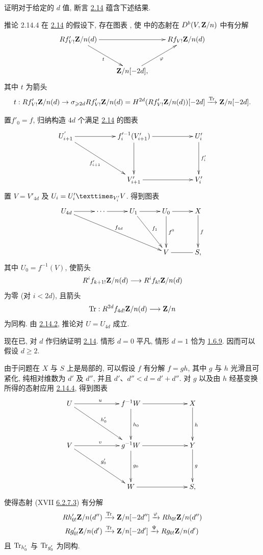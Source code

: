 证明对于给定的 $d$ 值, 断言 \hyperref[XVIII.thm2.14]{2.14} 蕴含下述结果.

\begin{enonce*}{推论 2.14.4}
在 \hyperref[XVIII.thm2.14]{2.14} 的假设下, 存在图表 , 使 \emph{} 中的态射在 $D^{b}(V,\protect\mathcal{\mathbf{Z}}/n)$ 中有分解
$$
\xymatrix@C=.75cm@R=1cm{
Rf'_{V!}\sheaf{\ZZ}/n(d)  \ar[rr] \ar[rd]_{t}&  & Rf_{V!}\sheaf{\ZZ}/n(d)\\
                          &\sheaf{\ZZ}/n[-2d], \ar[ru]_{\varphi}
}
$$
其中 $t$ 为箭头
$$
t:Rf'_{V!}\mathbf{Z}/n(d)\rightarrow \sigma_{\geqslant
2d}Rf'_{V!}\mathbf{Z}/n(d)=H^{2d}(Rf'_{V!}\mathbf{Z}/n(d))[-2d]\xrightarrow{\operatorname{Tr}}\protect\mathcal{\mathbf{Z}}/n[-2d]{}.
$$
\end{enonce*}

置\pageoriginale $f'_{0}=f$, 归纳构造 $4d$ 个满足 \hyperref[XVIII.thm2.14]{2.14} 的图表 
$$
\xymatrix@C=2cm@R=1.5cm{
U^{'}_{i+1} \ar[r]\ar[rd]_{f'_{i+1}}& f'^{-1}_{i}(V'_{i+1}) \ar[d]\ar[r]& U'_i \ar[d]^{f'_{i}}\\
            & V'_{i+1}  \ar[r]            & V'_i
}
$$
置 $V=V'_{4d}$ 及 $U_{i}=\fprod{U'_{i}}{V}{V'_{i}}$. 得到图表
$$
\xymatrix@R=1.5cm@C=1cm{
U_{4d}\ar[r] \ar[rrrd]^{f_{4d}}& \cdots \ar[r]& U_1 \ar[r]\ar[rd]^{f_1}& U_0\ar[r]\ar[d]^{f^0} & X \ar[d]^{f}\\
            &              &           & V \ar@{-}[r]  & S ,
}
$$
其中 $U_{0}=f^{-1}(V)$, 使箭头
$$
R^{i}f_{k+1!}\mathbf{Z}/n(d)\longrightarrow R^{i}f_{k!}\mathbf{Z}/n(d)
$$
为零 (对 $i<2d$), 且箭头
$$
\operatorname{Tr}:R^{2d}f_{4d!}\protect\mathcal{\mathbf{Z}}/n(d)\longrightarrow \protect\mathcal{\mathbf{Z}}/n
$$
为同构. 由 \hyperref[XVIII.lem2.14.2]{2.14.2}, 推论对 $U=U_{4d}$ 成立.

现在已, 对 $d$ 作归纳证明 \hyperref[XVIII.thm2.14]{2.14}. 情形 $d=0$ 平凡, 情形 $d=1$ 恰为 \hyperref[XVIII.lemfond1.6.9]{1.6.9}. 因而可以假设 $d\geq 2$.

由于问题在 $X$ 与 $S$ 上是局部的, 可以假设 $f$ 有分解 $f=gh$, 其中 $g$ 与 $h$ 光滑且可紧化, 纯相对维数为 $d'$ 及 $d''$, 并且 $d'$、$d''<d=d'+d''$. 对 $g$ 以及由 $h$ 经基变换所得的态射应用 \hyperref[XVIII.cor2.14.4]{2.14.4}, 得到图表
$$
\xymatrix@C=2.2cm@R=1.5cm{
  U  \ar[r]^{u} \ar[rd]^{h'_0} & f^{-1}W \ar[d]^{h_0}       \ar[r] & X \ar[d]^{h} \\
V  \ar[r]^{v} \ar[rd]^{g'_0} & g^{-1}W \ar[r] \ar[d]^{g_0}       & Y \ar[d]^{g}\\
               &    W   \ar[r]               & S,
}
$$
使得\pageoriginale 态射 (XVII \hyperref[XVII.eq6.2.7.3]{6.2.7.3}) 有分解
\begin{align*}
 Rh'_{0!}\mathbf{Z}/n(d'') & \xrightarrow{\operatorname{Tr}}
\mathbf{Z}/n[-2d'']\xrightarrow{\varphi} Rh_{0!}\mathbf{Z}/n(d'')\\
Rg'_{0!}\mathbf{Z}/n(d') & \xrightarrow{\operatorname{Tr}}\mathbf{Z}/n[-2d']\xrightarrow{\Psi} Rg_{0!}\mathbf{Z}/n(d')
\end{align*}
且 $\operatorname{Tr}_{h'_0}$ 与 $\operatorname{Tr}_{g'_0}$ 为同构.

